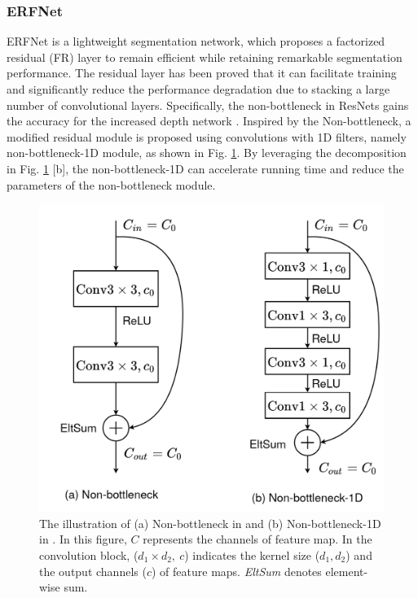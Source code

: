 \documentclass[journal]{IEEEtran}
\begin{document}
\subsubsection{ERFNet}
ERFNet \cite{romera2017erfnet} is a lightweight segmentation network, which proposes a factorized residual (FR) layer to remain efficient while retaining remarkable segmentation performance. The residual layer \cite{he2016deep} has been proved that it can facilitate training and significantly reduce the performance degradation due to stacking a large number of convolutional layers. Specifically, the non-bottleneck in ResNets gains the accuracy for the increased depth network \cite{he2016deep,zagoruyko2016wide,rastegari2016xnor}. Inspired by the Non-bottleneck, a modified residual module is proposed using convolutions with 1D filters, namely non-bottleneck-1D module, as shown in Fig. \ref{fg:bottleneck}. By leveraging the decomposition in Fig. \ref{fg:bottleneck} [b], the non-bottleneck-1D can accelerate running time and reduce the parameters of the non-bottleneck module. 

\begin{figure}[t]
    \centering
    \includegraphics[width=0.8\columnwidth]{imgs/erf-non-bottleneck-1d.png}
    \caption{The illustration of (a) Non-bottleneck in \cite{he2016deep} and (b) Non-bottleneck-1D in \cite{romera2017erfnet}. In this figure, $C$ represents the channels of feature map. In the convolution block, ($d_{1} \times d_{2},~c$) indicates the kernel size ($d_1, d_2$) and the output channels ($c$) of feature maps. \textit{EltSum} denotes element-wise sum.  }
    \label{fg:bottleneck}
\end{figure}
\end{document}
